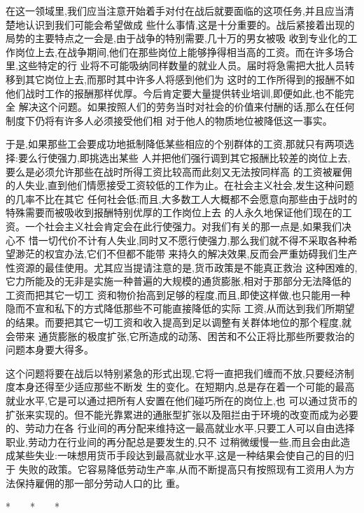 ﻿\documentclass[12pt]{article}
\begin{document}
在这一领域里,我们应当注意开始着手对付在战后就要面临的这项任务,并且应当清楚地认识到我们可能会希望做成
些什么事情,这是十分重要的。战后紧接着出现的局势的主要特点之一会是,由于战争的特别需要,几十万的男女被吸
收到专业化的工作岗位上去,在战争期间,他们在那些岗位上能够挣得相当高的工资。而在许多场合里,这些特定的行
业将不可能吸纳同样数量的就业人员。届时将急需把大批人员转移到其它岗位上去,而那时其中许多人将感到他们为
这时的工作所得到的报酬不如他们战时工作的报酬那样优厚。今后肯定要大量提供转业培训,即便如此,也不能完全
解决这个问题。如果按照人们的劳务当时对社会的价值来付酬的话,那么在任何制度下仍将有许多人必须接受他们相
对于他人的物质地位被降低这一事实。

于是,如果那些工会要成功地抵制降低某些相应的个别群体的工资,那就只有两项选择:要么行使强力,即挑选出某些
人并把他们强行调到其它报酬比较差的岗位上去,要么是必须允许那些在战时所得工资比较高而此刻又无法按同样高
的工资被雇佣的人失业,直到他们情愿接受工资较低的工作为止。在社会主义社会,发生这种问题的几率不比在其它
任何社会低;而且,大多数工人大概都不会愿意向那些由于战时的特殊需要而被吸收到报酬特别优厚的工作岗位上去
的人永久地保证他们现在的工资。一个社会主义社会肯定会在此行使强力。对我们有关的那一点是,如果我们决心不
惜一切代价不计有人失业,同时又不愿行使强力,那么我们就不得不采取各种希望渺茫的权宜办法,它们不但都不能带
来持久的解决效果,反而会严重妨碍我们生产性资源的最佳使用。尤其应当提请注意的是,货币政策是不能真正救治
这种困难的,它力所能及的无非是实施一种普遍的大规模的通货膨胀,相对于那部分无法降低的工资而把其它一切工
资和物价抬高到足够的程度,而且,即使这样做,也只能用一种隐而不宣和私下的方式降低那些不可能直接降低的实际
工资,从而达到我们所期望的结果。而要把其它一切工资和收入提高到足以调整有关群体地位的那个程度,就会带来
通货膨胀的极度扩张,它所造成的动荡、困苦和不公正将比那些所要救治的问题本身要大得多。

这个问题将要在战后以特别紧急的形式出现,它将一直把我们缠而不放,只要经济制度本身还得至少适应那些不断发
生的变化。在短期内,总是存在着一个可能的最高就业水平,它是可以通过把所有人安置在他们碰巧所在的岗位上,也
可以通过货币的扩张来实现的。但不能光靠累进的通胀型扩张以及阻拦由于环境的改变而成为必要的、劳动力在各
行业间的再分配来维持这一最高就业水平,只要工人可以自由选择职业,劳动力在行业间的再分配总是要发生的,只不
过稍微缓慢一些,而且会由此造成某些失业:一味想用货币手段达到最高就业水平,这是一种结果会使自己的目的归于
失败的政策。它容易降低劳动生产率,从而不断提高只有按照现有工资用人为方法保持雇佣的那一部分劳动人口的比
重。

*　　*　　*
\end{document}
